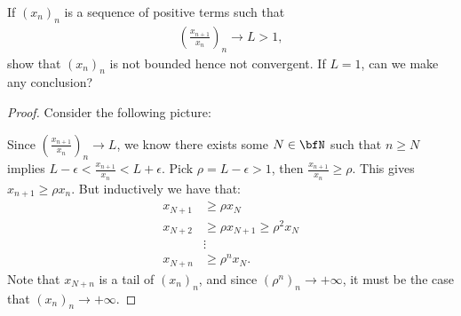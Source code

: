 \documentclass[10pt,twoside,openany]{memoir}
\begin{document}
    \begin{exercise}
        If $(x_n)_n$ is a sequence of positive terms such that
            \begin{equation*}
            \begin{split}
                \left(\frac{x_{n+1}}{x_n}\right)_n \rightarrow L > 1,
            \end{split}
            \end{equation*}
        show that $(x_n)_n$ is not bounded hence not convergent. If $L=1$, can we make any conclusion?
    \end{exercise}
        {\color{red} \begin{proof}
            Consider the following picture:
                \begin{center}
                \end{center}
            Since $\left(\frac{x_{n+1}}{x_n}\right)_n \rightarrow L$, we know there exists some $N \in \bfN$ such that $n \geq N$ implies $L - \epsilon < \frac{x_{n+1}}{x_n} < L + \epsilon$. Pick $\rho = L - \epsilon > 1$, then $\frac{x_{n+1}}{x_n} \geq \rho$. This gives $x_{n+1} \geq \rho x_n$. But inductively we have that:
                \begin{equation*}
                \begin{split}
                    x_{N+1} &\geq \rho x_{N} \\
                    x_{N+2} &\geq \rho x_{N+1} \geq \rho^2 x_{N} \\
                    &\vdots \\
                    x_{N+n} &\geq \rho^n x_N.
                \end{split}
                \end{equation*}
            Note that $x_{N+n}$ is a tail of $(x_n)_n$, and since $(\rho^n)_n \rightarrow +\infty$, it must be the case that $(x_n)_n \rightarrow +\infty$.


\end{proof}}
\end{document}
